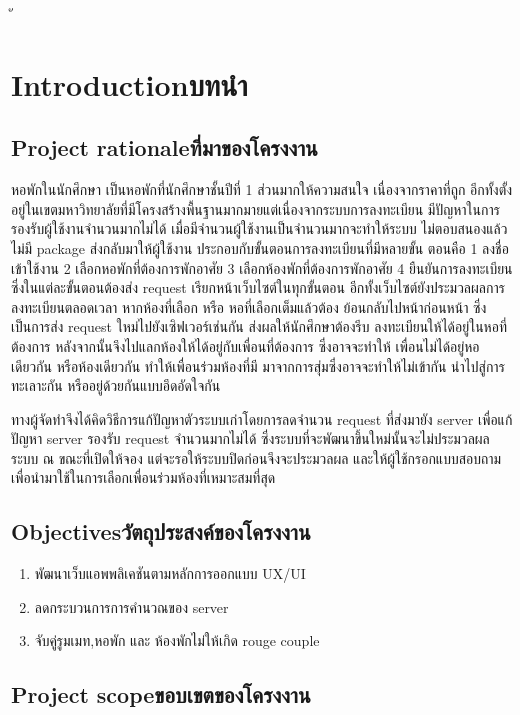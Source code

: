 ั\chapter{\ifenglish Introduction\else บทนำ\fi}

\section{\ifenglish Project rationale\else ที่มาของโครงงาน\fi}

หอพักในนักศึกษา เป็นหอพักที่นักศึกษาชั้นปีที่ 1 ส่วนมากให้ความสนใจ เนื่องจากราคาที่ถูก 
อีกทั้งตั้งอยู่ในเขตมหาวิทยาลัยที่มีโครงสร้างพื้นฐานมากมายแต่เนื่องจากระบบการลงทะเบียน
มีปัญหาในการรองรับผู้ใช้งานจำนวนมากไม่ได้ เมื่อมีจำนวนผู้ใช้งานเป็นจำนวนมากจะทำให้ระบบ
ไม่ตอบสนองแล้วไม่มี package ส่งกลับมาให้ผู้ใช้งาน ประกอบกับขั้นตอนการลงทะเบียนที่มีหลายขั้น
ตอนคือ 1 ลงชื่อเข้าใช้งาน 2 เลือกหอพักที่ต้องการพักอาศัย 3 เลือกห้องพักที่ต้องการพักอาศัย 
4 ยืนยันการลงทะเบียน ซึ่งในแต่ละขั้นตอนต้องส่ง request เรียกหน้าเว็บไซต์ในทุกขั้นตอน 
อีกทั้งเว็บไซต์ยังประมวลผลการลงทะเบียนตลอดเวลา หากห้องที่เลือก หรือ หอที่เลือกเต็มแล้วต้อง
ย้อนกลับไปหน้าก่อนหน้า ซึ่งเป็นการส่ง request ใหม่ไปยังเซิฟเวอร์เช่นกัน ส่งผลให้นักศึกษาต้องรีบ
ลงทะเบียนให้ได้อยู่ในหอที่ต้องการ หลังจากนั้นจึงไปแลกห้องให้ได้อยู่กับเพื่อนที่ต้องการ ซึ่งอาจจะทำให้
เพื่อนไม่ได้อยู่หอเดียวกัน หรือห้องเดียวกัน ทำให้เพื่อนร่วมห้องที่มี มาจากการสุ่มซึ่งอาจจะทำให้ไม่เข้ากัน
นำไปสู่การทะเลาะกัน หรืออยู่ด้วยกันแบบอึดอัดใจกัน

ทางผู้จัดทำจึงได้คิดวิธีการแก้ปัญหาตัวระบบเก่าโดยการลดจำนวน request ที่ส่งมายัง server เพื่อแก้ปัญหา 
server รองรับ request จำนวนมากไม่ได้ ซึ่งระบบที่จะพัฒนาขึ้นใหม่นั้นจะไม่ประมวลผลระบบ ณ ขณะที่เปิดให้จอง
แต่จะรอให้ระบบปิดก่อนจึงจะประมวลผล และให้ผู้ใช้กรอกแบบสอบถามเพื่อนำมาใช้ในการเลือกเพื่อนร่วมห้องที่เหมาะสมที่สุด

\section{\ifenglish Objectives\else วัตถุประสงค์ของโครงงาน\fi}
\begin{enumerate}
    \item พัฒนาเว็บแอพพลิเคชันตามหลักการออกแบบ UX/UI
    \item ลดกระบวนการการคำนวณของ server
    \item จับคู่รูมเมท,หอพัก และ ห้องพักไม่ให้เกิด rouge couple
\end{enumerate}

\section{\ifenglish Project scope\else ขอบเขตของโครงงาน\fi}
